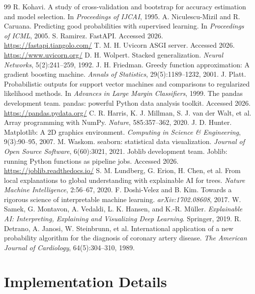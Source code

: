 \documentclass[12pt, a4paper, oneside]{book}
\begin{document}
\begin{thebibliography}{99}
 R. Kohavi. A study of cross-validation and bootstrap for accuracy estimation and model selection. In \textit{Proceedings of IJCAI}, 1995.
 A. Niculescu-Mizil and R. Caruana. Predicting good probabilities with supervised learning. In \textit{Proceedings of ICML}, 2005.
 S. Ramirez. FastAPI. Accessed 2026. \url{https://fastapi.tiangolo.com/}
 T. M. H. Uvicorn ASGI server. Accessed 2026. \url{https://www.uvicorn.org/}
 D. H. Wolpert. Stacked generalization. \textit{Neural Networks}, 5(2):241--259, 1992.
 J. H. Friedman. Greedy function approximation: A gradient boosting machine. \textit{Annals of Statistics}, 29(5):1189--1232, 2001.
 J. Platt. Probabilistic outputs for support vector machines and comparisons to regularized likelihood methods. In \textit{Advances in Large Margin Classifiers}, 1999.
 The pandas development team. pandas: powerful Python data analysis toolkit. Accessed 2026. \url{https://pandas.pydata.org/}
 C. R. Harris, K. J. Millman, S. J. van der Walt, et al. Array programming with NumPy. \textit{Nature}, 585:357--362, 2020.
 J. D. Hunter. Matplotlib: A 2D graphics environment. \textit{Computing in Science \& Engineering}, 9(3):90--95, 2007.
 M. Waskom. seaborn: statistical data visualization. \textit{Journal of Open Source Software}, 6(60):3021, 2021.
 Joblib development team. Joblib: running Python functions as pipeline jobs. Accessed 2026. \url{https://joblib.readthedocs.io/}
 S. M. Lundberg, G. Erion, H. Chen, et al. From local explanations to global understanding with explainable AI for trees. \textit{Nature Machine Intelligence}, 2:56--67, 2020.
 F. Doshi-Velez and B. Kim. Towards a rigorous science of interpretable machine learning. \textit{arXiv:1702.08608}, 2017.
 W. Samek, G. Montavon, A. Vedaldi, L. K. Hansen, and K.-R. M{\"u}ller. \textit{Explainable AI: Interpreting, Explaining and Visualizing Deep Learning}. Springer, 2019.
 R. Detrano, A. Janosi, W. Steinbrunn, et al. International application of a new probability algorithm for the diagnosis of coronary artery disease. \textit{The American Journal of Cardiology}, 64(5):304--310, 1989.
\end{thebibliography}

\appendix
\chapter{Implementation Details}
\end{document}
